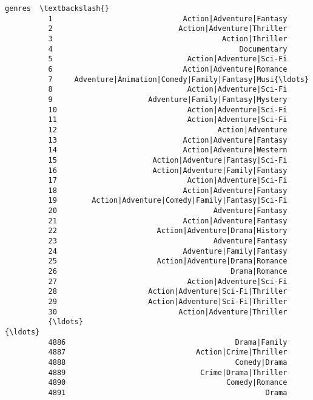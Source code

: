 \documentclass[11pt]{article}
\begin{document}
\begin{Verbatim}[commandchars=\\\{\}]
                                                           genres  \textbackslash{}
          1                              Action|Adventure|Fantasy   
          2                             Action|Adventure|Thriller   
          3                                       Action|Thriller   
          4                                           Documentary   
          5                               Action|Adventure|Sci-Fi   
          6                              Action|Adventure|Romance   
          7     Adventure|Animation|Comedy|Family|Fantasy|Musi{\ldots}   
          8                               Action|Adventure|Sci-Fi   
          9                      Adventure|Family|Fantasy|Mystery   
          10                              Action|Adventure|Sci-Fi   
          11                              Action|Adventure|Sci-Fi   
          12                                     Action|Adventure   
          13                             Action|Adventure|Fantasy   
          14                             Action|Adventure|Western   
          15                      Action|Adventure|Fantasy|Sci-Fi   
          16                      Action|Adventure|Family|Fantasy   
          17                              Action|Adventure|Sci-Fi   
          18                             Action|Adventure|Fantasy   
          19        Action|Adventure|Comedy|Family|Fantasy|Sci-Fi   
          20                                    Adventure|Fantasy   
          21                             Action|Adventure|Fantasy   
          22                       Action|Adventure|Drama|History   
          23                                    Adventure|Fantasy   
          24                             Adventure|Family|Fantasy   
          25                       Action|Adventure|Drama|Romance   
          26                                        Drama|Romance   
          27                              Action|Adventure|Sci-Fi   
          28                     Action|Adventure|Sci-Fi|Thriller   
          29                     Action|Adventure|Sci-Fi|Thriller   
          30                            Action|Adventure|Thriller   
          {\ldots}                                                 {\ldots}   
          4886                                       Drama|Family   
          4887                              Action|Crime|Thriller   
          4888                                       Comedy|Drama   
          4889                               Crime|Drama|Thriller   
          4890                                     Comedy|Romance   
          4891                                              Drama   

\end{Verbatim}
\end{document}
